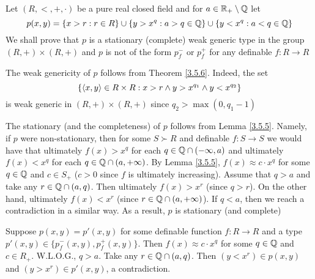 \documentclass[11pt]{article}
\begin{document}
\begin{examplle}[3.5.7]
\label{3.5.7}
Let \((R,<,+,\cdot)\) be a pure real closed field and for \(a\in\mathbb{R}_+\setminus\mathbb{Q}\) let
\begin{equation*}
p(x,y)=\{x>r:r\in R\}\cup\{y>x^q:a>q\in\mathbb{Q}\}\cup\{y<x^q:a<q\in\mathbb{Q}\}
\end{equation*}
We shall prove that \(p\) is a stationary (complete) weak generic type in the group \((R,+)\times(R,+)\)
and \(p\) is not of the form \(p_f^-\) or \(p_f^+\) for any definable \(f:R\to R\)

The weak genericity of \(p\) follows from Theorem \ref{3.5.6}. Indeed, the set
\begin{equation*}
\{\langle x,y\rangle\in R\times R:x>r\wedge y>x^{q_1}\wedge y<x^{q_2}\}
\end{equation*}
is weak generic in \((R,+)\times(R,+)\) since \(q_2>\max(0,q_1-1)\)

The stationary (and the completeness) of \(p\) follows from Lemma \ref{3.5.5}. Namely, if \(p\)
were non-stationary, then for some \(S\succ R\) and definable \(f:S\to S\) we would have that
ultimately \(f(x)>x^q\) for each \(q\in\mathbb{Q}\cap(-\infty,a)\) and ultimately \(f(x)<x^q\) for
each \(q\in\mathbb{Q}\cap(a,+\infty)\). By Lemma \ref{3.5.5}, \(f(x)\approx c\cdot x^q\) for some \(q\in\mathbb{Q}\) and \(c\in S_+\)
(\(c>0\) since \(f\) is ultimately increasing). Assume that \(q>a\) and take any \(r\in\mathbb{Q}\cap(a,q)\).
Then ultimately \(f(x)>x^r\) (since \(q>r\)). On the other hand, ultimately \(f(x)<x^r\)
(since \(r\in\mathbb{Q}\cap(a,+\infty)\)). If \(q<a\), then we reach a contradiction in a similar way. As a
result, \(p\) is stationary (and complete) \label{Problem6}

Suppose \(p(x,y)=p'(x,y)\) for some definable function \(f:R\to R\) and a type
\(p'(x,y)\in\{p_f^-(x,y),p_f^+(x,y)\}\). Then \(f(x)\approx c\cdot x^q\) for some \(q\in\mathbb{Q}\) and \(c\in R_+\).
W.L.O.G., \(q>a\). Take any \(r\in\mathbb{Q}\cap(a,q)\). Then \((y<x^r)\in p(x,y)\) and \((y>x^r)\in p'(x,y)\), a
contradiction.
\end{examplle}
\end{document}

